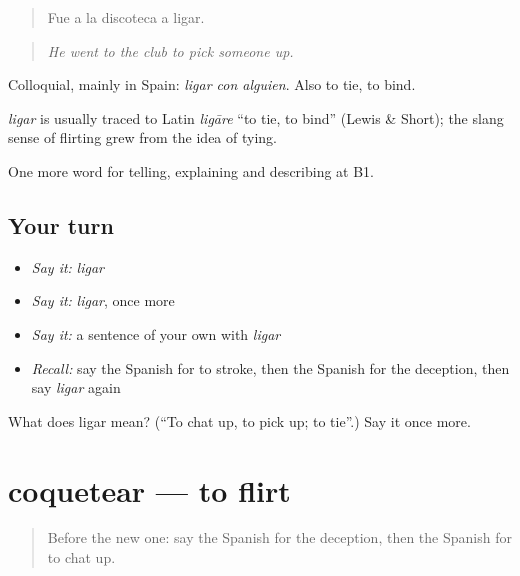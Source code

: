 \begin{quote}
Fue a la discoteca a ligar.
\end{quote}

\begin{quote}
\emph{He went to the club to pick someone up.}
\end{quote}

Colloquial, mainly in Spain: \emph{ligar con alguien}. Also to tie, to bind.

\begin{cousinweb}
\emph{ligar} is usually traced to Latin \emph{ligāre} \textquotedblleft{}to tie, to bind\textquotedblright{} (Lewis \& Short); the slang sense of flirting grew from the idea of tying.
\end{cousinweb}

\begin{grammarlens}[title={What you've built}]
One more word for telling, explaining and describing at B1.
\end{grammarlens}

\subsection*{Your turn}
\begin{itemize}
\raggedright
  \item \emph{Say it:} \emph{ligar}
  \item \emph{Say it:} \emph{ligar}, once more
  \item \emph{Say it:} a sentence of your own with \emph{ligar}
  \item \emph{Recall:} say the Spanish for to stroke, then the Spanish for the deception, then say \emph{ligar} again
\end{itemize}

\begin{tcolorbox}[breakable,colback=teal!4,colframe=teal!35!black,title={Before you move on}]
What does ligar mean? (\textquotedblleft{}To chat up, to pick up; to tie\textquotedblright{}.) Say it once more.
\end{tcolorbox}
\section[coquetear]{coquetear — to flirt}

\label{lesson:ES-C746-coquetear}



\begin{quote}
Before the new one: say the Spanish for the deception, then the Spanish for to chat up.
\end{quote}

